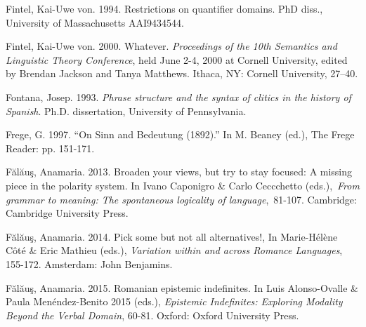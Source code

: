 \begin{styleStandard}
Fintel, Kai-Uwe von. 1994. Restrictions on quantifier domains. PhD diss., University of Massachusetts AAI9434544. \href{https://scholarworks.umass.edu/dissertations/%20AAI9434544}{}
\end{styleStandard}

\begin{styleStandard}
Fintel, Kai-Uwe von. 2000. Whatever. \textit{Proceedings of the 10th Semantics and Linguistic Theory Conference}, held June 2-4, 2000 at Cornell University, edited by Brendan Jackson and Tanya Matthews. Ithaca, NY: Cornell University, 27–40.
\end{styleStandard}

\begin{styleStandard}
Fontana, Josep. 1993. \textit{Phrase structure and the syntax of clitics in the history of Spanish}. Ph.D. dissertation, University of Pennsylvania.
\end{styleStandard}

\begin{styleStandard}
Frege, G. 1997. “On Sinn and Bedeutung (1892).” In M. Beaney (ed.), The Frege Reader: pp. 151-171.
\end{styleStandard}

\begin{styleStandard}
Fălăuş, Anamaria. 2013. Broaden your views, but try to stay focused: A missing piece in the polarity system. In Ivano Caponigro \& Carlo Ceccchetto (eds.),~\textit{From grammar to meaning: The spontaneous logicality of language},~81-107. Cambridge: Cambridge University Press. 
\end{styleStandard}

\begin{styleStandard}
Fălăuş, Anamaria. 2014. Pick some but not all alternatives!, In Marie-Hélène Côté \& Eric Mathieu (eds.), \textit{Variation within and across Romance Languages}, 155-172. Amsterdam: John Benjamins.
\end{styleStandard}

\begin{styleStandard}
Fălăuş, Anamaria. 2015. Romanian epistemic indefinites. In Luis Alonso-Ovalle \& Paula Menéndez-Benito 2015 (eds.), \textit{Epistemic Indefinites: Exploring Modality Beyond the Verbal Domain}, 60-81. Oxford: Oxford University Press.
\end{styleStandard}

